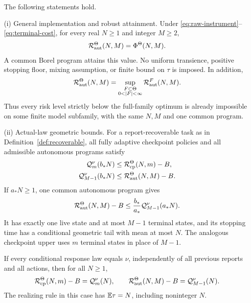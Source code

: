 \begin{theorem}\label{thm:main}
The following statements hold.

\smallskip\noindent\textup{(i) General implementation and robust attainment.}
Under \eqref{eq:raw-instrument}--\eqref{eq:terminal-cost}, for every real $N\ge1$ and integer $M\ge2$,
\begin{equation}\label{eq:value-equality}
 \mathcal R_{\mathrm{aut}}^\Theta(N,M)=\Phi^\Theta(N,M).
\end{equation}
A common Borel program attains this value. No uniform transience, positive stopping floor, mixing assumption, or finite bound on $\tau$ is imposed. In addition,
\begin{equation}\label{eq:finite-models}
 \calR_\aut^\Theta(N,M)
 =\sup_{\substack{F\subset\Theta\\0<|F|<\infty}}
         \calR_\aut^F(N,M).
\end{equation}
Thus every risk level strictly below the full-family optimum is already impossible on some finite model subfamily, with the same $N,M$ and one common program.

\smallskip\noindent\textup{(ii) Actual-law geometric bounds.}
For a report-recoverable task as in Definition~\ref{def:recoverable}, all fully adaptive checkpoint policies and all admissible autonomous programs satisfy
\begin{align}
 \mathcal Q_m^\nu(b_*N)&\le\mathcal R_{\mathrm{cp}}^\Theta(N,m)-B,
 \label{eq:profile-check-lower}\\
 \mathcal Q_{M-1}^\nu(b_*N)&\le\mathcal R_{\mathrm{aut}}^\Theta(N,M)-B.
 \label{eq:profile-aut-lower}
\end{align}
If $a_*N\ge1$, one common autonomous program gives
\begin{equation}\label{eq:profile-aut-upper}
 \mathcal R_{\mathrm{aut}}^\Theta(N,M)-B
 \le\frac{b_*}{a_*}\mathcal Q_{M-1}^\nu(a_*N).
\end{equation}
It has exactly one live state and at most $M-1$ terminal states, and its stopping time has a conditional geometric tail with mean at most $N$. The analogous checkpoint upper uses $m$ terminal states in place of $M-1$.

If every conditional response law equals $\nu$, independently of all previous reports and all actions, then for all $N\ge1$,
\begin{equation}\label{eq:exact-profile}
 \mathcal R_{\mathrm{cp}}^\Theta(N,m)-B=\mathcal Q_m^\nu(N),\qquad
 \mathcal R_{\mathrm{aut}}^\Theta(N,M)-B=\mathcal Q_{M-1}^\nu(N).
\end{equation}
The realizing rule in this case has $\mathbb E\tau=N$, including noninteger $N$.


\end{theorem}
